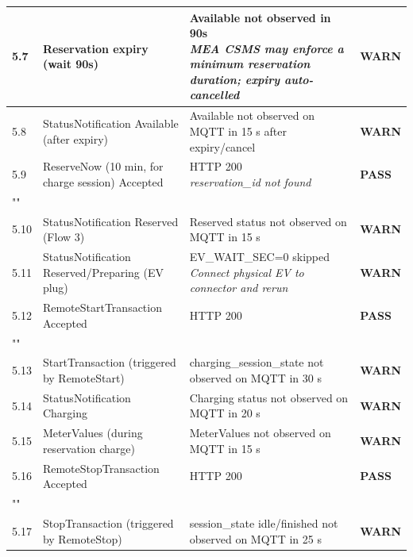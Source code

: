 \documentclass[10pt, a4paper]{article}
\begin{document}
\begin{longtable}{|L{1cm}|L{5.5cm}|M{7cm}|C{1.8cm}|}
\hline
\small 5.7 & \small Reservation expiry (wait 90s) & Available not observed in 90s{\newline\normalfont\footnotesize\itshape MEA CSMS may enforce a minimum reservation duration; expiry auto-cancelled} & \textcolor{warnorange}{\textbf{WARN}} \\
\hline
\small 5.8 & \small StatusNotification Available (after expiry) & Available not observed on MQTT in 15 s after expiry/cancel & \textcolor{warnorange}{\textbf{WARN}} \\
\hline
\small 5.9 & \small ReserveNow (10 min, for charge session)  Accepted & HTTP 200{\newline\normalfont\footnotesize\itshape reservation\_id not found} & \textcolor{passgreen}{\textbf{PASS}} \\
\hline
{} \\
\hline
\small 5.10 & \small StatusNotification Reserved (Flow 3) & Reserved status not observed on MQTT in 15 s & \textcolor{warnorange}{\textbf{WARN}} \\
\hline
\small 5.11 & \small StatusNotification Reserved/Preparing (EV plug) & EV\_WAIT\_SEC=0  skipped{\newline\normalfont\footnotesize\itshape Connect physical EV to connector and rerun} & \textcolor{warnorange}{\textbf{WARN}} \\
\hline
\small 5.12 & \small RemoteStartTransaction  Accepted & HTTP 200 & \textcolor{passgreen}{\textbf{PASS}} \\
\hline
{} \\
\hline
\small 5.13 & \small StartTransaction (triggered by RemoteStart) & charging\_session\_state not observed on MQTT in 30 s & \textcolor{warnorange}{\textbf{WARN}} \\
\hline
\small 5.14 & \small StatusNotification Charging & Charging status not observed on MQTT in 20 s & \textcolor{warnorange}{\textbf{WARN}} \\
\hline
\small 5.15 & \small MeterValues (during reservation charge) & MeterValues not observed on MQTT in 15 s & \textcolor{warnorange}{\textbf{WARN}} \\
\hline
\small 5.16 & \small RemoteStopTransaction  Accepted & HTTP 200 & \textcolor{passgreen}{\textbf{PASS}} \\
\hline
{} \\
\hline
\small 5.17 & \small StopTransaction (triggered by RemoteStop) & session\_state idle/finished not observed on MQTT in 25 s & \textcolor{warnorange}{\textbf{WARN}} \\

\end{longtable}
\end{document}
